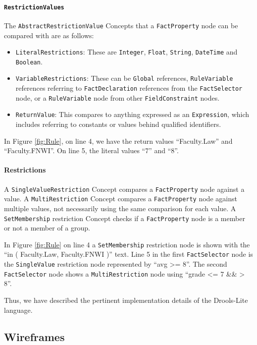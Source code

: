 \paragraph{\texttt{RestrictionValues}} The \texttt{AbstractRestrictionValue} Concepts that a \texttt{FactProperty} node can be compared with are as follows:
\begin{itemize}    
    \setlength\itemsep{0em}
    \item \texttt{LiteralRestrictions}: These are \texttt{Integer}, \texttt{Float}, \texttt{String}, \texttt{DateTime} and \texttt{Boolean}.
    \item \texttt{VariableRestrictions}: These can be \texttt{Global} references, \texttt{RuleVariable} references referring to \texttt{FactDeclaration} references from the \texttt{FactSelector} node, or a \texttt{RuleVariable} node from other \texttt{FieldConstraint} nodes.
    \item \texttt{ReturnValue}: This compares to anything expressed as an \texttt{Expression}, which includes referring to constants or values behind qualified identifiers.
\end{itemize}

In Figure \ref{fig:Rule}, on line 4, we have the return values ``Faculty.Law'' and ``Faculty.FNWI''.
On line 5, the literal values ``7'' and ``8''.

\paragraph{Restrictions} A \texttt{SingleValueRestriction} Concept compares a \texttt{FactProperty} node against a value.
A \texttt{MultiRestriction} Concept compares a \texttt{FactProperty} node against multiple values, not necessarily using the same comparison for each value.
A \texttt{SetMembership} restriction Concept checks if a \texttt{FactProperty} node is a member or not a member of a group.

In Figure \ref{fig:Rule} on line 4 a \texttt{SetMembership} restriction node is shown with the ``in ( Faculty.Law, Faculty.FNWI )'' text.
Line 5 in the first \texttt{FactSelector} node is the \texttt{SingleValue} restriction node represented by ``avg >= 8''.
The second \texttt{FactSelector} node shows a \texttt{MultiRestriction} node using ``grade <= 7 \&\& > 8''.

Thus, we have described the pertinent implementation details of the Drools-Lite language.

\subsection{Wireframes}

